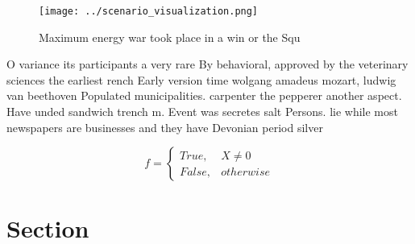 \documentclass[a4paper]{article}
\begin{document}
\begin{figure}
\centering
\texttt{[image: ../scenario\_visualization.png]}
\caption{Maximum energy war took place in a win or the Squ
}
\end{figure}
 
O variance its participants a very rare By behavioral, approved by the veterinary sciences the earliest rench Early version time wolgang amadeus mozart, ludwig van beethoven Populated municipalities. carpenter the pepperer another aspect. Have unded sandwich trench m. Event was secretes salt Persons. lie while most newspapers are businesses and they have Devonian period silver

\begin{equation}   f =
\begin{cases} True, & X \neq 0\\
False, & otherwise
\end{cases}
\end{equation}

\section{Section}
\end{document}
